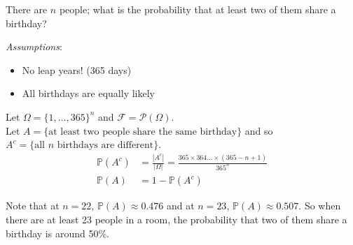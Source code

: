 \begin{example}
    There are $n$ people; what is the probability that at least two of them share a birthday?

    \emph{Assumptions}:
    \begin{itemize}
        \item No leap years! (365 days)
        \item All birthdays are equally likely
    \end{itemize} 

    Let $\Omega = \{1, \dots, 365\}^n$ and $\mathcal F = \mathcal P(\Omega)$. \\
    Let $A = \{ \text{at least two people share the same birthday} \}$ and so \\ 
    $A^c = \{\text{all $n$ birthdays are different} \}$.
    \begin{align*}
        \mathbb{P}(A^c) &= \frac{|A^c|}{|\Omega|} = \frac{365 \times 364 \dots \times (365 - n + 1)}{365^n} \\
        \mathbb{P}(A) &= 1 - \mathbb{P}(A^c)
    \end{align*} 

    Note that at $n=22$, $\mathbb{P}(A) \approx 0.476$ and at $n=23$, $\mathbb{P}(A) \approx 0.507$.
    So when there are at least 23 people in a room, the probability that two of them share a birthday is around 50\%.

\end{example}